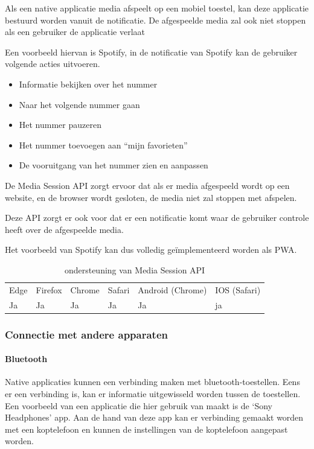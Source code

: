 Als een native applicatie media afspeelt op een mobiel toestel, kan deze applicatie bestuurd worden vanuit de notificatie. De afgespeelde media zal ook niet stoppen als een gebruiker de applicatie verlaat

Een voorbeeld hiervan is Spotify, in de notificatie van Spotify kan de gebruiker volgende acties uitvoeren.
 \begin{itemize}
   \item	Informatie bekijken over het nummer
   \item	Naar het volgende nummer gaan
   \item	Het nummer pauzeren
   \item	Het nummer toevoegen aan “mijn favorieten”
   \item	De vooruitgang van het nummer zien en aanpassen
\end{itemize}
De Media Session API \autocite{Beaufort2019} zorgt ervoor dat als er media afgespeeld wordt op een website, en de browser wordt gesloten, de media niet zal stoppen met afspelen.

Deze API zorgt er ook voor dat er een notificatie komt waar de gebruiker controle heeft over de afgespeelde media. 

Het voorbeeld van Spotify kan dus volledig geïmplementeerd worden als PWA.

\begin{table}[H]
	\centering
	\begin{tabular}{llllll}
		Edge & Firefox & Chrome & Safari & Android (Chrome) & IOS (Safari) \\
		Ja   & Ja      & Ja     & Ja     & Ja               & ja          
	\end{tabular}	
	\caption{ondersteuning van Media Session API}
\end{table}



\subsubsection{Connectie met andere apparaten}



\paragraph{Bluetooth }

Native applicaties kunnen een verbinding maken met bluetooth-toestellen. Eens er een verbinding is, kan er informatie uitgewisseld worden tussen de toestellen. Een voorbeeld van een applicatie die hier gebruik van maakt is de ‘Sony Headphones’ app. Aan de hand van deze app kan er verbinding gemaakt worden met een koptelefoon en kunnen de instellingen van de koptelefoon aangepast worden.

